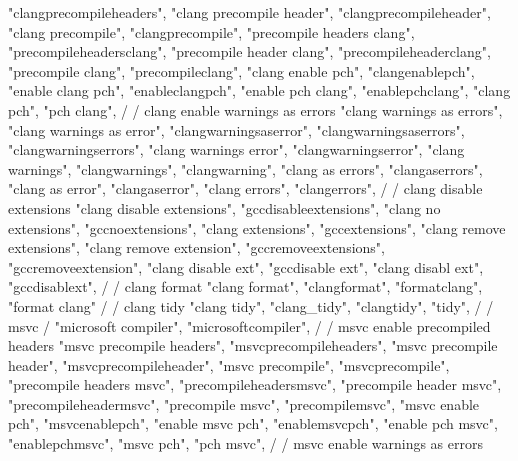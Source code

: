 {{{{{{{{        "clangprecompileheaders",  
        "clang precompile header",  
        "clangprecompileheader",  
        "clang precompile",  
        "clangprecompile",  
        "precompile headers clang",  
        "precompileheadersclang",  
        "precompile header clang",  
        "precompileheaderclang",  
        "precompile clang",  
        "precompileclang",  
        "clang enable pch",  
        "clangenablepch",  
        "enable clang pch",  
        "enableclangpch",  
        "enable pch clang",  
        "enablepchclang",  
        "clang pch",  
        "pch clang",  
        /
        / clang enable warnings as errors
        "clang warnings as errors", 
        "clang warnings as error", 
        "clangwarningsaserror", 
        "clangwarningsaserrors", 
        "clangwarningserrors", 
        "clang warnings error", 
        "clangwarningserror", 
        "clang warnings", 
        "clangwarnings", 
        "clangwarning", 
        "clang as errors", 
        "clangaserrors", 
        "clang as error", 
        "clangaserror", 
        "clang errors", 
        "clangerrors", 
        /
        / clang disable extensions 
        "clang disable extensions", 
        "gccdisableextensions", 
        "clang no extensions", 
        "gccnoextensions", 
        "clang extensions", 
        "gccextensions", 
        "clang remove extensions", 
        "clang remove extension", 
        "gccremoveextensions", 
        "gccremoveextension", 
        "clang disable ext", 
        "gccdisable ext", 
        "clang disabl ext", 
        "gccdisablext", 
        /
        / clang format 
        "clang format",
        "clangformat",
        "formatclang",
        "format clang"
        /
        / clang tidy 
        "clang tidy",  
        "clang_tidy", "clangtidy", "tidy",  
        /
        / msvc  
        / {"microsoft compiler", "microsoftcompiler",  
        /
        / msvc enable precompiled headers 
        "msvc precompile headers",  
        "msvcprecompileheaders",  
        "msvc precompile header",  
        "msvcprecompileheader",  
        "msvc precompile",  
        "msvcprecompile",  
        "precompile headers msvc",  
        "precompileheadersmsvc",  
        "precompile header msvc",  
        "precompileheadermsvc",  
        "precompile msvc",  
        "precompilemsvc",  
        "msvc enable pch",  
        "msvcenablepch",  
        "enable msvc pch",  
        "enablemsvcpch",  
        "enable pch msvc",  
        "enablepchmsvc",  
        "msvc pch",  
        "pch msvc",  
        /
        / msvc enable warnings as errors
}}}}}}}}}
